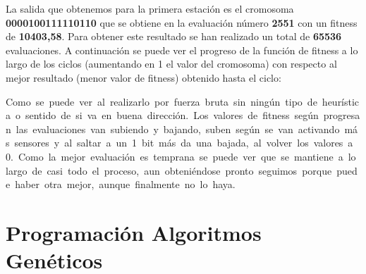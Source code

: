\documentclass[12pt, spanish, pdftex]{UC3M_document}
\begin{document}
La salida que obtenemos para la primera estación es el cromosoma \textbf{0000100111110110} que se obtiene en la evaluación número \textbf{2551} con un fitness de \textbf{10403,58}. Para obtener este resultado se han realizado un total de \textbf{65536} evaluaciones. A continuación se puede ver el progreso de la función de fitness a lo largo de los ciclos (aumentando en 1 el valor del cromosoma) con respecto al mejor resultado (menor valor de fitness) obtenido hasta el ciclo:
\begin{figure}[H]
	{\def\svgwidth{.95\textwidth}
		}
\end{figure}
\vspace{-.7cm}
Como se puede ver al realizarlo por fuerza bruta sin ningún tipo de heurística o sentido de si va en buena dirección. Los valores de fitness según progresan las evaluaciones van subiendo y bajando, suben según se van activando más sensores y al saltar a un 1 bit más da una bajada, al volver los valores a 0. Como la mejor evaluación es temprana se puede ver que se mantiene a lo largo de casi todo el proceso, aun obteniéndose pronto seguimos porque puede haber otra mejor, aunque finalmente no lo haya.

\section{Programación Algoritmos Genéticos}
\end{document}
